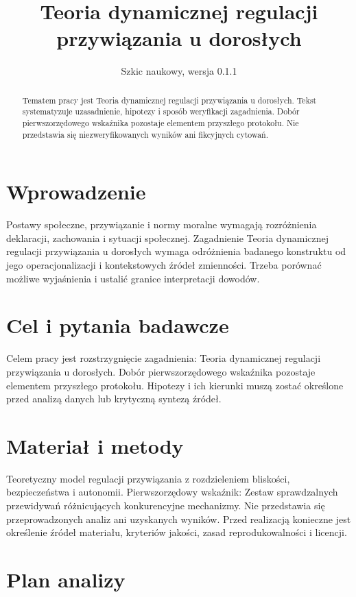 \documentclass[11pt,a4paper]{article}
\title{Teoria dynamicznej regulacji przywiązania u dorosłych}
\author{}
\date{Szkic naukowy, wersja 0.1.1}
\begin{document}
\maketitle

\begin{abstract}

Tematem pracy jest Teoria dynamicznej regulacji przywiązania u dorosłych. Tekst systematyzuje uzasadnienie, hipotezy i sposób weryfikacji zagadnienia. Dobór pierwszorzędowego wskaźnika pozostaje elementem przyszłego protokołu. Nie przedstawia się niezweryfikowanych wyników ani fikcyjnych cytowań.

\end{abstract}

\section{Wprowadzenie}

Postawy społeczne, przywiązanie i normy moralne wymagają rozróżnienia deklaracji, zachowania i sytuacji społecznej. Zagadnienie Teoria dynamicznej regulacji przywiązania u dorosłych wymaga odróżnienia badanego konstruktu od jego operacjonalizacji i kontekstowych źródeł zmienności. Trzeba porównać możliwe wyjaśnienia i ustalić granice interpretacji dowodów.

\section{Cel i pytania badawcze}

Celem pracy jest rozstrzygnięcie zagadnienia: Teoria dynamicznej regulacji przywiązania u dorosłych. Dobór pierwszorzędowego wskaźnika pozostaje elementem przyszłego protokołu. Hipotezy i ich kierunki muszą zostać określone przed analizą danych lub krytyczną syntezą źródeł.

\section{Materiał i metody}

Teoretyczny model regulacji przywiązania z rozdzieleniem bliskości, bezpieczeństwa i autonomii. Pierwszorzędowy wskaźnik: Zestaw sprawdzalnych przewidywań różnicujących konkurencyjne mechanizmy. Nie przedstawia się przeprowadzonych analiz ani uzyskanych wyników. Przed realizacją konieczne jest określenie źródeł materiału, kryteriów jakości, zasad reprodukowalności i licencji.

\section{Plan analizy}
\end{document}
